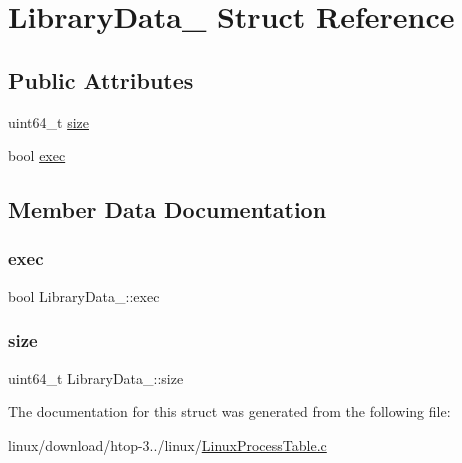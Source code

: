 \hypertarget{structLibraryData__}{}\section{Library\+Data\+\_\+ Struct Reference}
\label{structLibraryData__}
\subsection*{Public Attributes}
\begin{DoxyCompactItemize}
\item 
uint64\+\_\+t \hyperlink{structLibraryData___a4bb2d114baa8c8ce6e87a219a9107ab9}{size}
\item 
bool \hyperlink{structLibraryData___ae51fa33f6a3e14f59ed666283f061a32}{exec}
\end{DoxyCompactItemize}


\subsection{Member Data Documentation}
\mbox{\label{structLibraryData___ae51fa33f6a3e14f59ed666283f061a32}} 
\subsubsection{\texorpdfstring{exec}{exec}}
{\footnotesize\ttfamily bool Library\+Data\+\_\+\+::exec}

\mbox{\label{structLibraryData___a4bb2d114baa8c8ce6e87a219a9107ab9}} 
\subsubsection{\texorpdfstring{size}{size}}
{\footnotesize\ttfamily uint64\+\_\+t Library\+Data\+\_\+\+::size}



The documentation for this struct was generated from the following file\+:\begin{DoxyCompactItemize}
\item 
linux/download/htop-\/3../linux/\hyperlink{LinuxProcessTable_8c}{Linux\+Process\+Table.\+c}\end{DoxyCompactItemize}
